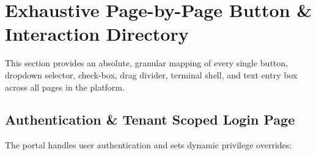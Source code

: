\documentclass[11pt,a4paper]{article}
\begin{document}
\newpage

\section{Exhaustive Page-by-Page Button \& Interaction Directory}
This section provides an absolute, granular mapping of every single button, dropdown selector, check-box, drag divider, terminal shell, and text entry box across all pages in the platform.

\subsection{Authentication \& Tenant Scoped Login Page}
The portal handles user authentication and sets dynamic privilege overrides:
\end{document}
